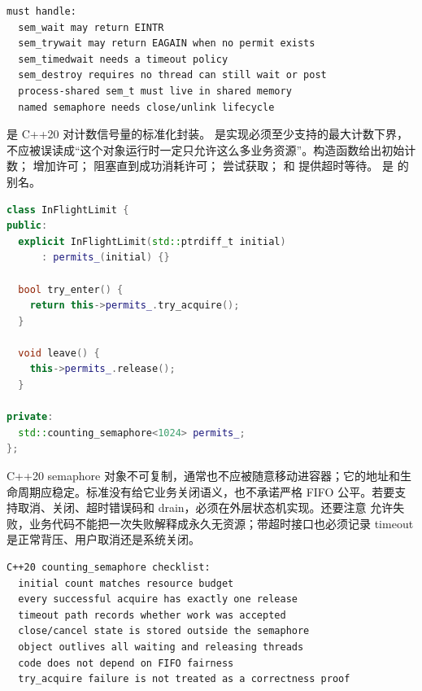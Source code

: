 \begin{lstlisting}[numbers=none,caption={POSIX semaphore 的工程边界}]
must handle:
  sem_wait may return EINTR
  sem_trywait may return EAGAIN when no permit exists
  sem_timedwait needs a timeout policy
  sem_destroy requires no thread can still wait or post
  process-shared sem_t must live in shared memory
  named semaphore needs close/unlink lifecycle
\end{lstlisting}

 是 C++20 对计数信号量的标准化封装。 是实现必须至少支持的最大计数下界，不应被误读成“这个对象运行时一定只允许这么多业务资源”。构造函数给出初始计数； 增加许可； 阻塞直到成功消耗许可； 尝试获取； 和  提供超时等待。 是  的别名。

\begin{lstlisting}[language=C++,caption={C++20 counting\_semaphore 的最小接口形状}]
class InFlightLimit {
public:
  explicit InFlightLimit(std::ptrdiff_t initial)
      : permits_(initial) {}

  bool try_enter() {
    return this->permits_.try_acquire();
  }

  void leave() {
    this->permits_.release();
  }

private:
  std::counting_semaphore<1024> permits_;
};
\end{lstlisting}

C++20 semaphore 对象不可复制，通常也不应被随意移动进容器；它的地址和生命周期应稳定。标准没有给它业务关闭语义，也不承诺严格 FIFO 公平。若要支持取消、关闭、超时错误码和 drain，必须在外层状态机实现。还要注意  允许失败，业务代码不能把一次失败解释成永久无资源；带超时接口也必须记录 timeout 是正常背压、用户取消还是系统关闭。

\begin{lstlisting}[numbers=none,caption={C++20 semaphore 审查清单}]
C++20 counting_semaphore checklist:
  initial count matches resource budget
  every successful acquire has exactly one release
  timeout path records whether work was accepted
  close/cancel state is stored outside the semaphore
  object outlives all waiting and releasing threads
  code does not depend on FIFO fairness
  try_acquire failure is not treated as a correctness proof
\end{lstlisting}

